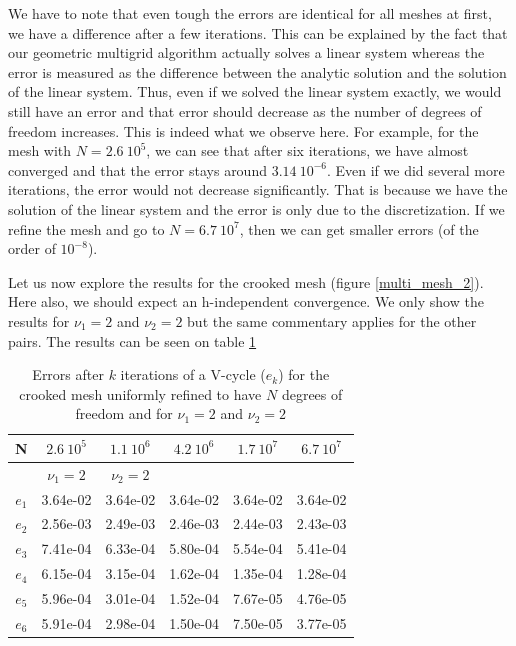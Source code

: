 We have to note that even tough the errors are identical for all meshes at first, we have a difference after a few iterations. This can be explained by the fact that our geometric multigrid algorithm actually solves a linear system whereas the error is measured as the difference between the analytic solution and the solution of the linear system. Thus, even if we solved the linear system exactly, we would still have an error and that error should decrease as the number of degrees of freedom increases. This is indeed what we observe here. For example, for the mesh with $N=2.6\:10^5$, we can see that after six iterations, we have almost converged and that the error stays around $3.14\:10^{-6}$. Even if we did several more iterations, the error would not decrease significantly. That is because we have the solution of the linear system and the error is only due to the discretization. If we refine the mesh and go to $N=6.7\:10^7$, then we can get smaller errors (of the order of $10^{-8}$).

Let us now explore the results for the crooked mesh (figure \ref{multi_mesh_2}). Here also, we should expect an h-independent convergence. We only show the results for $\nu_1=2$ and $\nu_2=2$ but the same commentary applies for the other pairs. The results can be seen on table \ref{multi_err_crook}

\begin{table}
\centering
\begin{tabular}{c|ccccc}
\hline
N & $2.6\:10^5$ & $1.1\:10^6$ & $4.2\: 10^6$& $1.7\:10^7$ & $6.7\:10^7$ \\
 \hline
  & $\nu_1=2$ & $\nu_2=2$ & & &\\
  \hline
  $e_1$ & 3.64e-02 &	3.64e-02 &	3.64e-02 &	3.64e-02 &	3.64e-02\\
  $e_2$ & 2.56e-03 &	2.49e-03 &	2.46e-03	& 2.44e-03 &	2.43e-03\\
  $e_3$ & 7.41e-04 &	6.33e-04 &	5.80e-04 &	5.54e-04 &	5.41e-04\\
  $e_4$ & 6.15e-04 &	3.15e-04 &	1.62e-04 &	1.35e-04 &	1.28e-04\\
  $e_5$ & 5.96e-04 &	3.01e-04 &	1.52e-04 &	7.67e-05	& 4.76e-05\\
  $e_6$ & 5.91e-04 &	2.98e-04 &	1.50e-04 &	7.50e-05 &	3.77e-05\\
  \hline
\end{tabular}
\caption{Errors after $k$ iterations of a V-cycle ($e_k$) for the crooked mesh uniformly refined to have $N$ degrees of freedom and for $\nu_1=2$ and $\nu_2=2$}
\label{multi_err_crook}
\end{table}

